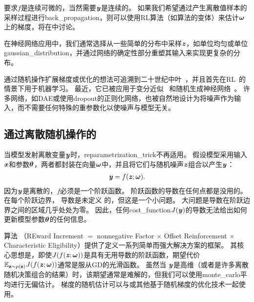 要求$f$是连续可微的，当然需要$\boldsymbol{\mathit{y}}$是连续的。
如果我们希望通过产生离散值样本的采样过程进行\gls{back_propagation}，则可以使用\gls{RL}算法（如算法\citep{Williams-1992}的变体）来估计$\boldsymbol{\omega}$上的梯度，将在中讨论。

在神经网络应用中，我们通常选择从一些简单的分布中采样$\boldsymbol{\mathit{z}}$，如单位均匀或单位\gls{gaussian_distribution}，并通过网络的确定性部分重塑其输入来实现更复杂的分布。

通过随机操作扩展梯度或优化的想法可追溯到二十世纪中叶~\citep{Price-1958,Bonnet-1964}，并且首先在\gls{RL}~\citep{Williams-1992}的情景下用于机器学习。
最近，它已被应用于变分近似~\citep{Opper+Archambeau-2009} 和随机生成神经网络~\citep{bengio2013estimating,Kingma-arxiv2013,Kingma+Welling-arxiv2014,Kingma+Welling-ICLR2014,Rezende-et-al-ICML2014,Goodfellow-et-al-NIPS2014-small}。
许多网络，如\gls{DAE}或使用\gls{dropout}的正则化网络，也被自然地设计为将噪声作为输入，而不需要任何特殊的重参数化以使噪声与模型无关。


\subsection{通过离散随机操作的}
\label{sec:back_propagating_through_discrete_stochastic_operations}

当模型发射离散变量$\boldsymbol{\mathit{y}}$时，\gls{reparametrization_trick}不再适用。
假设模型采用输入$\boldsymbol{\mathit{x}}$和参数$\boldsymbol{\theta}$，两者都封装在向量$\boldsymbol{\omega}$中，并且将它们与随机噪声$\boldsymbol{\mathit{z}}$组合以产生$\boldsymbol{\mathit{y}}$：
\begin{align}
 \boldsymbol{\mathit{y}} = f(\boldsymbol{\mathit{z}};\boldsymbol{\omega}).
\end{align}
因为$\boldsymbol{\mathit{y}}$是离散的，$f$必须是一个阶跃函数。
阶跃函数的导数在任何点都是没用的。
在每个阶跃边界， 导数是未定义 的，但这是一个小问题。
大问题是导数在阶跃边界之间的区域几乎处处为零。
因此，任何\gls{cost_function}$J(\boldsymbol{\mathit{y}})$的导数无法给出如何更新模型参数$\boldsymbol{\theta}$的任何信息。

算法 （REward Increment $=$ nonnegative Factor $\times$ Offset Reinforcement $\times$ Characteristic Eligibility）提供了定义一系列简单而强大解决方案的框架\citep{Williams-1992}。
其核心思想是，即使$J(f(\boldsymbol{\mathit{z}};\boldsymbol{\omega}))$是具有无用导数的阶跃函数，期望代价$\mathbb{E}_{\mathbf{z} \sim p(\mathbf{z})} J(f(\boldsymbol{\mathit{z}};\boldsymbol{\omega}))$通常是服从\gls{GD}的光滑函数。
虽然当 $\boldsymbol{\mathit{y}}$是高维（或者是许多离散随机决策组合的结果）时，该期望通常是难解的，但我们可以使用\gls{monte_carlo}平均进行无偏估计。
梯度的随机估计可以与或其他基于随机梯度的优化技术一起使用。

